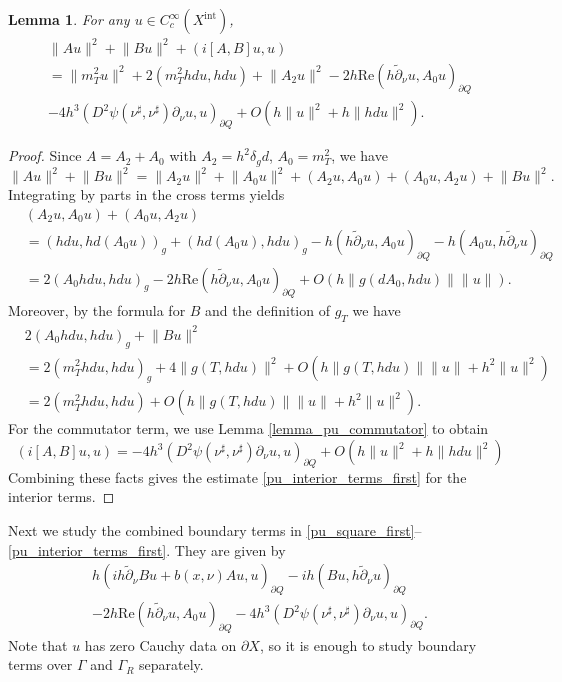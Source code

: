 \documentclass[11pt,letterpaper]{amsart}
\newtheorem{Lemma}[Theorem]{Lemma}
\theoremstyle{definition}
\numberwithin{equation}{section}
\newcommand{\norm}[1]{\lVert #1 \rVert}         %
\newcommand{\p}{\partial}
\def\p{\partial}
\begin{document}
\begin{Lemma} \label{lemma_pu_interior_terms}
For any $u \in C^{\infty}_c(X^{\mathrm{int}})$, 
\begin{multline} \label{pu_interior_terms_first}
\norm{Au}^2 + \norm{Bu}^2 + ( i [A, B] u, u) \\
 = \norm{m_T^2 u}^2 + 2 (m_T^2 hdu, hdu) + \norm{A_2 u}^2 - 2 h \mathrm{Re}( h \tilde{\p}_{\nu} u, A_0 u)_{\p Q} \\
  - 4 h^3 (D^2 \psi(\nu^{\sharp}, \nu^{\sharp}) \p_{\nu} u, u)_{\p Q}  + O(h \norm{u}^2 + h \norm{hdu}^2).
\end{multline}
\end{Lemma}
\begin{proof}
Since $A = A_2 + A_0$ with $A_2 = h^2 \delta_g d$, $A_0 = m_T^2$, we have 
\[
\norm{Au}^2 + \norm{Bu}^2 = \norm{A_2 u}^2 + \norm{A_0 u}^2 + (A_2 u, A_0 u) + (A_0 u, A_2 u) + \norm{Bu}^2.
\]
Integrating by parts in the cross terms yields 
\begin{align*}
 &(A_2 u, A_0 u) + (A_0 u, A_2 u) \\
 &= (hd u, hd(A_0 u))_g + (hd(A_0 u), hdu)_g - h( h \tilde{\p}_{\nu} u, A_0 u)_{\p Q} - h(A_0 u, h \tilde{\p}_{\nu} u)_{\p Q} \\
 &= 2 (A_0 hdu, hdu)_g - 2 h \mathrm{Re}( h \tilde{\p}_{\nu} u, A_0 u)_{\p Q} + O(h \norm{g(dA_0, hdu)} \norm{u}).
\end{align*}
Moreover, by the formula for $B$ and the definition of $g_T$ we have 
\begin{align*}
 &2 (A_0 hdu, hdu)_g + \norm{Bu}^2 \\
 &= 2 (m_T^2 hdu, hdu)_g + 4 \norm{g(T, hdu)}^2 + O(h \norm{g(T,hdu)} \norm{u} + h^2 \norm{u}^2) \\
 &= 2 (m_T^2 hdu, hdu) + O(h \norm{g(T,hdu)} \norm{u} + h^2 \norm{u}^2).
\end{align*}
For the commutator term, we use Lemma \ref{lemma_pu_commutator} to obtain 
\[
( i [A, B] u, u) = -4 h^3 (D^2 \psi(\nu^{\sharp}, \nu^{\sharp}) \p_{\nu} u, u)_{\p Q} + O(h \norm{u}^2 + h \norm{hdu}^2)
\]
Combining these facts gives the estimate \eqref{pu_interior_terms_first} for the interior terms.
\end{proof}
 

Next we study the combined boundary terms in \eqref{pu_square_first}--\eqref{pu_interior_terms_first}. They are given by 
\begin{multline} \label{pu_boundary_terms_combined}
h (i h\tilde{\p}_{\nu} Bu + b(x,\nu) Au, u)_{\p Q} - ih(Bu, h \tilde{\p}_{\nu} u)_{\p Q} \\
 - 2 h \mathrm{Re}( h \tilde{\p}_{\nu} u, A_0 u)_{\p Q} - 4 h^3 (D^2 \psi(\nu^{\sharp}, \nu^{\sharp}) \p_{\nu} u, u)_{\p Q}.
\end{multline}
Note that $u$ has zero Cauchy data on $\p X$, so it is enough to study boundary terms over $\Gamma$ and $\Gamma_R$ separately.
\end{document}
